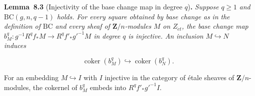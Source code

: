 \documentclass[11pt]{article}
\newenvironment{bpstatement}[2]{\par\addvspace{0.6\baselineskip}\noindent\textbf{#1}#2\textbf{.}\enspace\ignorespaces}
  {\par\addvspace{0.4\baselineskip}}
\newenvironment{bpstatementit}[2]{\begin{bpstatement}{#1}{#2}\itshape\ignorespaces}{\end{bpstatement}}
\begin{document}
\label{bp17}%
\begin{bpstatementit}{Lemma~8.3}{ (Injectivity of the base change map in degree $q$)}
Suppose \(q\geq1\) and \(\mathrm{BC}(g,n,q-1)\) holds. For every square obtained by base change as in the definition of \(\mathrm{BC}\) and every sheaf of \(\mathbf Z/n\)-modules \(M\) on \(Z_{\acute{e}t}\), the base change map \(b_M^q:g^{-1}R^qf_*M\to R^qf'_*g'^{-1}M\) in degree \(q\) is injective. An inclusion \(M\hookrightarrow N\) induces

\[
\operatorname{coker}(b_M^q)
\hookrightarrow\operatorname{coker}(b_N^q).
\]

For an embedding \(M\hookrightarrow I\) with \(I\) injective in the category of étale sheaves of \(\mathbf Z/n\)-modules, the cokernel of \(b_M^q\) embeds into \(R^qf'_*g'^{-1}I\).
\end{bpstatementit}
\end{document}
